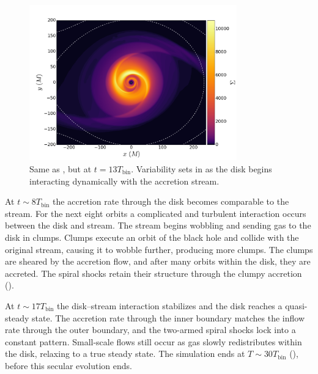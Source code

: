 \begin{figure}
\begin{center}
\includegraphics[width=0.8\textwidth]{figures/minidisk/q011_m3_sig_1300.pdf}
\end{center}
\caption{ Same as , but at $t = 13 T_\text{bin}$.  Variability sets in as the disk begins interacting dynamically with the accretion stream.}
\end{figure}


At $t\sim 8 T_\text{bin}$ the accretion rate through the disk becomes comparable to the stream.  For the next eight orbits a complicated and turbulent interaction occurs between the disk and stream.  The stream begins wobbling and sending gas to the disk in clumps.  Clumps execute an orbit of the black hole and collide with the original stream, causing it to wobble further, producing more clumps.  The clumps are sheared by the accretion flow, and after many orbits within the disk, they are accreted. The spiral shocks retain their structure through the clumpy accretion ().

At $t\sim17 T_\text{bin}$ the disk--stream interaction stabilizes and the disk reaches a quasi-steady state.  The accretion rate through the inner boundary matches the inflow rate through the outer boundary, and the two-armed spiral shocks lock into a constant pattern.  Small-scale flows still occur as gas slowly redistributes within the disk, relaxing to a true steady state.  The simulation ends at $T\sim30 T_\text{bin}$ (), before this secular evolution ends.

